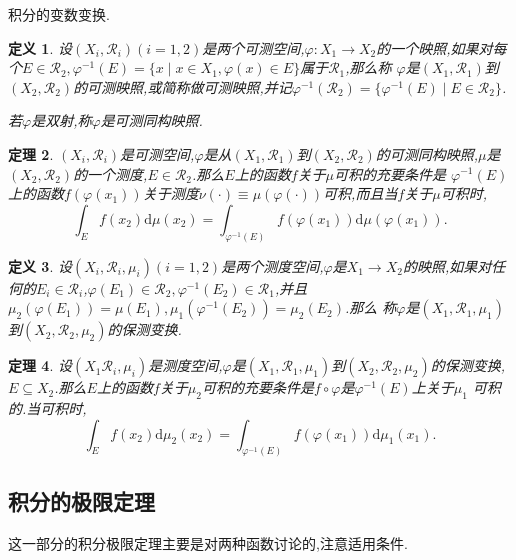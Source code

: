 \documentclass[12pt,a4paper,oneside]{ctexart}
\theoremstyle{nonumberplain}
\theoremstyle{plain}
\newtheorem{theorem}{定理}[section]
\theoremstyle{plain}
\theoremstyle{nonumberplain}
\theoremstyle{plain}
\theoremstyle{plain}
\newtheorem{definition}[theorem]{定义}
\theoremstyle{plain}
\theoremstyle{plain}
\newcommand{\dif}{\mathrm{d}}
\renewcommand{\phi}{\varphi}
\newcommand{\cR}{\mathcal{R}}
\begin{document}
    积分的变数变换.

    \begin{definition}
        设$(X_i,\cR_i)(i=1,2)$是两个可测空间,$\phi:X_1\longrightarrow X_2$的一个映照,如果对每个$E\in\cR_2,\phi^{-1}(E)=\{x\mid x\in X_1,\phi(x)\in E\}$属于$\cR_1$,那么称 
        $\phi$是$(X_1,\cR_1)$到$(X_2,\cR_2)$的可测映照,或简称做可测映照,并记$\phi^{-1}(\cR_2)=\{\phi^{-1}(E)\mid E\in\cR_2\}$.

        若$\phi$是双射,称$\phi$是可测同构映照.
    \end{definition}

    \begin{theorem}
        $(X_i,\cR_i)$是可测空间,$\phi$是从$(X_1,\cR_1)$到$(X_2,\cR_2)$的可测同构映照,$\mu$是$(X_2,\cR_2)$的一个测度,$E\in\cR_2$.那么$E$上的函数$f$关于$\mu$可积的充要条件是
        $\phi^{-1}(E)$上的函数$f(\phi(x_1))$关于测度$\nu(\cdot)\equiv\mu(\phi(\cdot))$可积,而且当$f$关于$\mu$可积时,
        \begin{equation*}
            \int_E f(x_2)\dif\mu(x_2)=\int_{\phi^{-1}(E)}f(\phi(x_1))\dif\mu(\phi(x_1)).
        \end{equation*}
    \end{theorem}

    \begin{definition}
        设$(X_i,\cR_i,\mu_i)(i=1,2)$是两个测度空间,$\phi$是$X_1\longrightarrow X_2$的映照,如果对任何的$E_i\in\cR_i$,$\phi(E_1)\in\cR_2,\phi^{-1}(E_2)\in\cR_1$,并且$\mu_2(\phi(E_1))=\mu(E_1),\mu_1(\phi^{-1}(E_2))=\mu_2(E_2)$.那么 
        称$\phi$是$(X_1,\cR_1,\mu_1)$到$(X_2,\cR_2,\mu_2)$的保测变换.
    \end{definition}

    \begin{theorem}
        设$(X_1\cR_i,\mu_i)$是测度空间,$\phi$是$(X_1,\cR_1,\mu_1)$到$(X_2,\cR_2,\mu_2)$的保测变换,$E\subseteq X_2$.那么$E$上的函数$f$关于$\mu_2$可积的充要条件是$f\circ \phi$是$\phi^{-1}(E)$上关于$\mu_1$
        可积的.当可积时,
        \begin{equation*}
            \int_Ef(x_2)\dif\mu_2(x_2)=\int_{\phi^{-1}(E)}f(\phi(x_1))\dif\mu_1(x_1).
        \end{equation*}
    \end{theorem}

    \subsection{积分的极限定理}

    这一部分的积分极限定理主要是对两种函数讨论的,注意适用条件.
\end{document}
